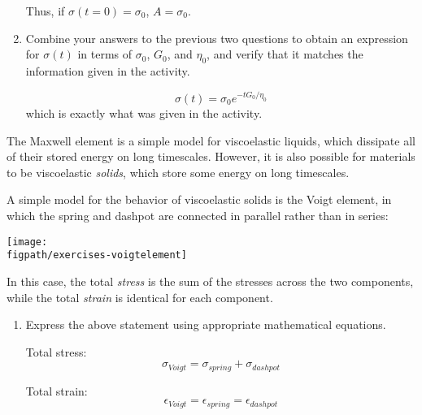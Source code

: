 \begin{activity}
\begin{exercises}
\begin{enumerate}
\begin{solution}
						Thus, if $\sigma(t=0) = \sigma_0$, $A = \sigma_0$.
					\end{solution}
				
				\item Combine your answers to the previous two questions to obtain an expression for $\sigma(t)$ in terms of $\sigma_0$, $G_0$, and $\eta_0$, and verify that it matches the information given in the activity.
				
					\begin{solution}
						\begin{equation*}
							\sigma(t) = \sigma_0 e^{-t G_0 / \eta_0}
						\end{equation*}
						which is exactly what was given in the activity.
					\end{solution}
			\end{enumerate}
		
		\exercise The Maxwell element is a simple model for viscoelastic liquids, which dissipate all of their stored energy on long timescales.  However, it is also possible for materials to be viscoelastic \emph{solids}, which store some energy on long timescales.
		
			A simple model for the behavior of viscoelastic solids is the Voigt element, in which the spring and dashpot are connected in parallel rather than in series:
		
			\centerline{\texttt{[image: \\figpath/exercises-voigtelement]}}
			
			In this case, the total \emph{stress} is the sum of the stresses across the two components, while the total \emph{strain} is identical for each component.
			
			\begin{enumerate}
				\item Express the above statement using appropriate mathematical equations. 
				
					\begin{solution}
						Total stress:
						\begin{equation*}
							\sigma_{Voigt} = \sigma_{spring} + \sigma_{dashpot}
						\end{equation*}
						
						Total strain:
						\begin{equation*}
							\epsilon_{Voigt} = \epsilon_{spring} = \epsilon_{dashpot}
						\end{equation*}
					\end{solution}
					

\end{enumerate}
\end{exercises}
\end{activity}
